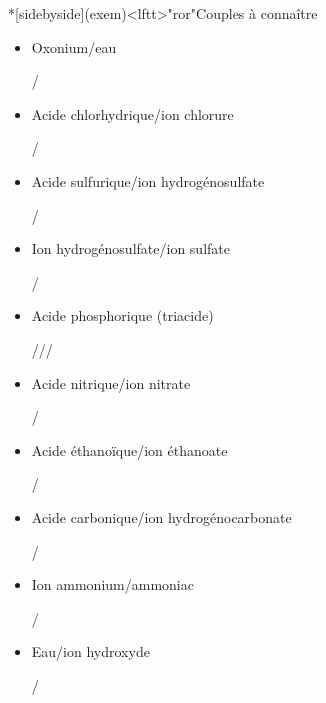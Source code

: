\documentclass[../../main/main.tex]{subfiles}
\begin{document}
\begin{tcb*}*[sidebyside](exem)<lftt>"ror"{Couples à connaître}
	\begin{itemize}
		\item Oxonium/eau
		      \begin{center}
			      /
		      \end{center}
		\item Acide chlorhydrique/ion chlorure
		      \begin{center}
			      /
		      \end{center}
		\item Acide sulfurique/ion hydrogénosulfate
		      \begin{center}
			      /
		      \end{center}
		\item Ion hydrogénosulfate/ion sulfate
		      \begin{center}
			      /
		      \end{center}
		\item Acide phosphorique (triacide)
		      \begin{center}
			      ///
		      \end{center}
	\end{itemize}
	\tcblower
	\begin{itemize}
		\item Acide nitrique/ion nitrate
		      \begin{center}
			      /
		      \end{center}
		\item Acide éthanoïque/ion éthanoate
		      \begin{center}
			      /
		      \end{center}
		\item Acide carbonique/ion hydrogénocarbonate
		      \begin{center}
			      /
		      \end{center}
		\item Ion ammonium/ammoniac
		      \begin{center}
			      /
		      \end{center}
		\item Eau/ion hydroxyde
		      \begin{center}
			      /
		      \end{center}
	\end{itemize}
\end{tcb*}
\end{document}
